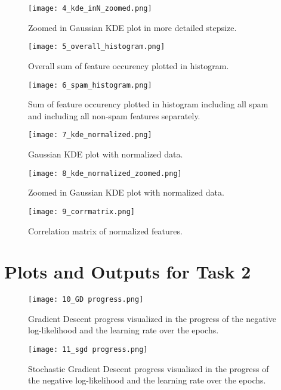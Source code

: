 \documentclass[a4paper,oneside,bibliography=totoc]{scrartcl}
\begin{document}
\begin{figure}[H]
    \centering
    \texttt{[image: 4\_kde\_inN\_zoomed.png]}
    \caption{Zoomed in Gaussian KDE plot in more detailed stepsize.}
    \label{fig:4}
\end{figure}

\begin{figure}[H]
    \centering
    \texttt{[image: 5\_overall\_histogram.png]}
    \caption{Overall sum of feature occurency plotted in histogram.}
    \label{fig:5}
\end{figure}

\begin{figure}[H]
    \centering
    \texttt{[image: 6\_spam\_histogram.png]}
    \caption{Sum of feature occurency plotted in histogram including all spam and including all non-spam features separately.}
    \label{fig:6}
\end{figure}

\begin{figure}[H]
    \centering
    \texttt{[image: 7\_kde\_normalized.png]}
    \caption{Gaussian KDE plot with normalized data.}
    \label{fig:7}
\end{figure}

\begin{figure}[H]
    \centering
    \texttt{[image: 8\_kde\_normalized\_zoomed.png]}
    \caption{Zoomed in Gaussian KDE plot with normalized data.}
    \label{fig:8}
\end{figure}

\begin{figure}[H]
    \centering
    \texttt{[image: 9\_corrmatrix.png]}
    \caption{Correlation matrix of normalized features.}
    \label{fig:9}
\end{figure}


\section{Plots and Outputs for Task 2}
\label{section2}

\begin{figure}[H]
    \centering
    \texttt{[image: 10\_GD progress.png]}
    \caption{Gradient Descent progress visualized in the progress of the negative log-likelihood and the learning rate over the epochs.}
    \label{fig:10}
\end{figure}

\begin{figure}[H]
    \centering
    \texttt{[image: 11\_sgd progress.png]}
    \caption{Stochastic Gradient Descent progress visualized in the progress of the negative log-likelihood and the learning rate over the epochs.}
    \label{fig:11}
\end{figure}
\end{document}
